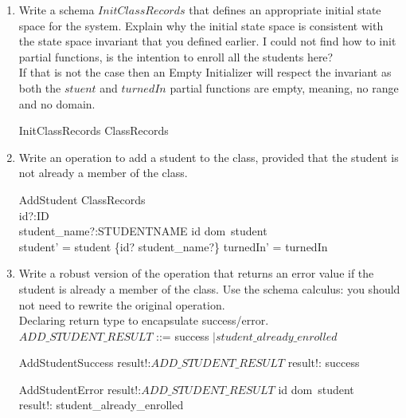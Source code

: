 \documentclass{article}
\begin{document}
\begin{enumerate}
\begin{enumerate}
\item Write a schema $InitClassRecords$ that defines an
appropriate initial state space for the system. Explain why the
initial state space is consistent with the state space invariant
that you defined earlier.
\color{blue}
I could not find how to init partial functions, is the intention to enroll all the students here? \\
If that is not the case then an Empty Initializer will respect the invariant as both the $stuent$ and $turnedIn$ partial functions are empty, meaning, no range and no domain.
\begin{schema}{InitClassRecords}
   ClassRecords
\where
\color{blue}
\end{schema}
\color{black}
\item Write an operation to add a student to the class, provided
that the student is not already a member of the class.
\color{blue}
\begin{schema}{AddStudent}
  \Delta ClassRecords \\
  id?:ID \\
  student\_name?:STUDENTNAME
\where
id \notin dom\, student \\
student' = student \union \{id? \mapsto student\_name?\} \land turnedIn' = turnedIn
\end{schema}
\color{black}

\item Write a robust version of the operation that returns an error
value if the student is already a member of the class. Use the schema
calculus: you should not need to rewrite the original operation.
\color{blue}\\
Declaring return type to encapsulate success/error. \\
$ADD\_STUDENT\_RESULT$ ::= success $\mid student\_already\_enrolled$ \\
\begin{schema}{AddStudentSuccess}
    result!:$ADD\_STUDENT\_RESULT$
  \where
    result!: success
\end{schema}

\begin{schema}{AddStudentError}
    result!:$ADD\_STUDENT\_RESULT$ 
    \where
    id \in dom\, student \\ 
    result!: student\_already\_enrolled
\end{schema}


\end{enumerate}
\end{enumerate}
\end{document}
